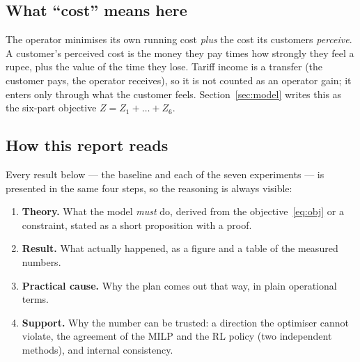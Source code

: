 \subsection{What ``cost'' means here}

The operator minimises its own running cost \emph{plus} the cost its customers \emph{perceive}. A customer's
perceived cost is the money they pay times how strongly they feel a rupee, plus the value of the time they lose.
Tariff income is a transfer (the customer pays, the operator receives), so it is not counted as an operator
gain; it enters only through what the customer feels. Section~\ref{sec:model} writes this as the six-part
objective $Z=Z_1+\dots+Z_6$.

\subsection{How this report reads}

Every result below --- the baseline and each of the seven experiments --- is presented in the same four steps,
so the reasoning is always visible:
\begin{enumerate}
  \item \textbf{Theory.} What the model \emph{must} do, derived from the objective~\eqref{eq:obj} or a
  constraint, stated as a short proposition with a proof.
  \item \textbf{Result.} What actually happened, as a figure and a table of the measured numbers.
  \item \textbf{Practical cause.} Why the plan comes out that way, in plain operational terms.
  \item \textbf{Support.} Why the number can be trusted: a direction the optimiser cannot violate, the
  agreement of the MILP and the RL policy (two independent methods), and internal consistency.
\end{enumerate}

